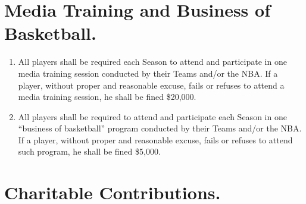 \documentclass[
]{book}
\providecommand{\tightlist}{%
  \setlength{\itemsep}{0pt}\setlength{\parskip}{0pt}}
\begin{document}
\hypertarget{media-training-and-business-of-basketball.}{%
\section{Media Training and Business of Basketball.}\label{media-training-and-business-of-basketball.}}

\begin{enumerate}
\def\labelenumi{(\alph{enumi})}
\tightlist
\item
  All players shall be required each Season to attend and participate in one media training session conducted by their Teams and/or the NBA. If a player, without proper and reasonable excuse, fails or refuses to attend a media training session, he shall be fined \$20,000.
\item
  All players shall be required to attend and participate each Season in one ``business of basketball'' program conducted by their Teams and/or the NBA. If a player, without proper and reasonable excuse, fails or refuses to attend such program, he shall be fined \$5,000.
\end{enumerate}

\hypertarget{charitable-contributions.}{%
\section{Charitable Contributions.}\label{charitable-contributions.}}
\end{document}
